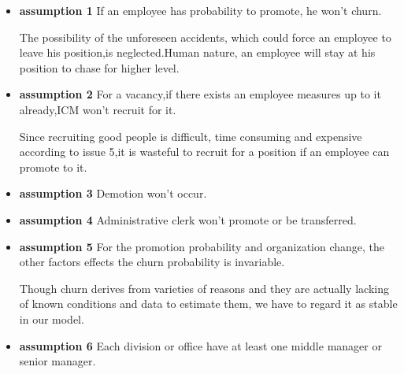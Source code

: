 \documentclass[12pt,a4paper,titlepage]{article}
\begin{document}
\begin{itemize}
\item \textbf{assumption 1} If an employee has probability to
  promote, he won't churn.

The possibility of the unforeseen accidents, which could force an
employee to leave his position,is neglected.Human nature, an employee
will stay at his position to chase for higher level.

\item \textbf{assumption 2} For a vacancy,if there exists an
  employee measures up to it already,ICM won't recruit for it.

Since recruiting good people is difficult, time consuming and
expensive according to issue 5,it is wasteful to recruit for a
position if an employee can promote to it.

\item \textbf{assumption 3} Demotion won't occur.

\item \textbf{assumption 4} Administrative clerk won't promote or be
  transferred.

\item \textbf{assumption 5} For the promotion probability and
  organization change, the other factors effects the churn probability
  is invariable.

Though churn derives from varieties of reasons and they are actually
lacking of known conditions and data to estimate them, we have to
regard it as stable in our model.

\item \textbf{assumption 6} Each division or office have at least one
  middle manager or senior manager.

\end{itemize}

\end{document}
